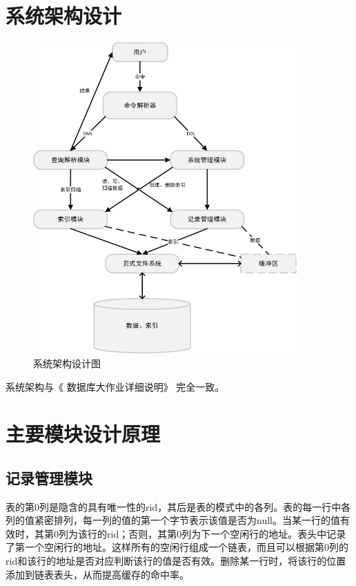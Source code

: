 \documentclass[11pt,UTF8]{report}
\begin{document}
	\section{系统架构设计}
	\begin{figure}[!ht]
		\centering
		\includegraphics[width=0.9\textwidth]{structure}
		\caption{系统架构设计图}
		\label{fig:structure}
	\end{figure}
	
	系统架构与《 数据库大作业详细说明》 完全一致。
	
	\section{主要模块设计原理}
	
	\subsection{记录管理模块}
	表的第0列是隐含的具有唯一性的rid，其后是表的模式中的各列。表的每一行中各列的值紧密排列，每一列的值的第一个字节表示该值是否为null。当某一行的值有效时，其第0列为该行的rid；否则，其第0列为下一个空闲行的地址。表头中记录了第一个空闲行的地址。这样所有的空闲行组成一个链表，而且可以根据第0列的rid和该行的地址是否对应判断该行的值是否有效。删除某一行时，将该行的位置添加到链表表头，从而提高缓存的命中率。
	
\end{document}
